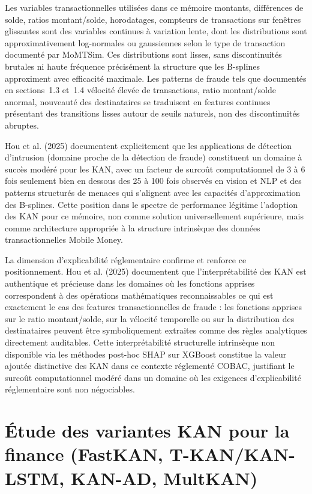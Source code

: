 \documentclass[11pt,a4paper,oneside]{report}
\theoremstyle{definition}
\theoremstyle{remark}
\begin{document}
Les variables transactionnelles utilisées dans ce mémoire  montants, différences de solde, ratios montant/solde, horodatages, compteurs de transactions sur fenêtres glissantes  sont des variables continues à variation lente, dont les distributions sont approximativement log-normales ou gaussiennes selon le type de transaction documenté par MoMTSim. Ces distributions sont lisses, sans discontinuités brutales ni haute fréquence  précisément la structure que les B-splines approximent avec efficacité maximale. Les patterns de fraude tels que documentés en sections~1.3 et~1.4  vélocité élevée de transactions, ratio montant/solde anormal, nouveauté des destinataires  se traduisent en features continues présentant des transitions lisses autour de seuils naturels, non des discontinuités abruptes.

Hou et al. (2025) documentent explicitement que les applications de détection d'intrusion (domaine proche de la détection de fraude) constituent un domaine à succès modéré pour les KAN, avec un facteur de surcoût computationnel de 3 à 6 fois seulement  bien en dessous des 25 à 100 fois observés en vision et NLP  et des patterns structurés de menaces qui s'alignent avec les capacités d'approximation des B-splines. Cette position dans le spectre de performance légitime l'adoption des KAN pour ce mémoire, non comme solution universellement supérieure, mais comme architecture appropriée à la structure intrinsèque des données transactionnelles Mobile Money.

La dimension d'explicabilité réglementaire confirme et renforce ce positionnement. Hou et al. (2025) documentent que l'interprétabilité des KAN est authentique et précieuse dans les domaines où les fonctions apprises correspondent à des opérations mathématiques reconnaissables  ce qui est exactement le cas des features transactionnelles de fraude : les fonctions apprises sur le ratio montant/solde, sur la vélocité temporelle ou sur la distribution des destinataires peuvent être symboliquement extraites comme des règles analytiques directement auditables. Cette interprétabilité structurelle intrinsèque  non disponible via les méthodes post-hoc SHAP sur XGBoost  constitue la valeur ajoutée distinctive des KAN dans ce contexte réglementé COBAC, justifiant le surcoût computationnel modéré dans un domaine où les exigences d'explicabilité réglementaire sont non négociables.

\section{Étude des variantes KAN pour la finance (FastKAN, T-KAN/KAN-LSTM, KAN-AD, MultKAN)}
\end{document}

